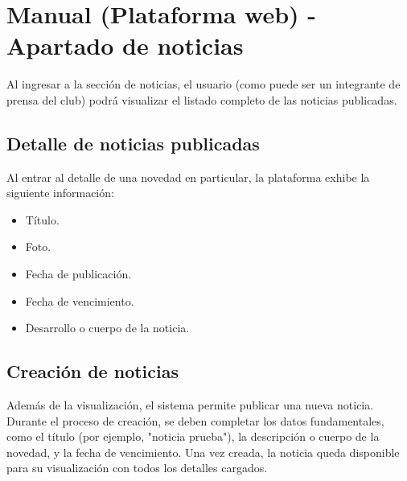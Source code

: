 \section{Manual (Plataforma web) - Apartado de noticias}

Al ingresar a la sección de noticias, el usuario (como puede ser un integrante de prensa del club) podrá visualizar el listado completo de las noticias publicadas.

\subsection{Detalle de noticias publicadas}
Al entrar al detalle de una novedad en particular, la plataforma exhibe la siguiente información:
\begin{itemize}
    \item Título.
    \item Foto.
    \item Fecha de publicación.
    \item Fecha de vencimiento.
    \item Desarrollo o cuerpo de la noticia.
\end{itemize}

\subsection{Creación de noticias}
Además de la visualización, el sistema permite publicar una nueva noticia. Durante el proceso de creación, se deben completar los datos fundamentales, como el título (por ejemplo, "noticia prueba"), la descripción o cuerpo de la novedad, y la fecha de vencimiento. Una vez creada, la noticia queda disponible para su visualización con todos los detalles cargados.
